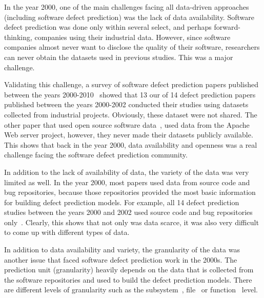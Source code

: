 In the year 2000, one of the main challenges facing all data-driven approaches (including software defect prediction) was the lack of data availability. Software defect prediction was done only within several select, and perhaps forward-thinking, companies using their industrial data.
However, since software companies almost never want to disclose the quality of their software, researchers can never obtain the datasets used in previous studies. This was a major challenge.

Validating this challenge, a survey of software defect prediction papers published between the years 2000-2010~\cite{Shihab2012PhD} showed that 13 our of 14 defect prediction papers published between the years 2000-2002 conducted their studies using datasets collected from industrial projects. Obviously, these dataset were not shared. The other paper that used open source software data~\cite{Denaro2002ICSE}, used data from the Apache Web server project, however, they never made their datasets publicly available. This shows that back in the year 2000, data availability and openness was a real challenge facing the software defect prediction community.

In addition to the lack of availability of data, the variety of the data was very limited as well. In the year 2000, most papers used data from source code and bug repositories, because those repositories provided the most basic information for building defect prediction models. For example, all 14 defect prediction studies between the years 2000 and 2002 used source code and bug repositories only~\cite{Shihab2012PhD}. Clearly, this shows that not only was data scarce, it was also very difficult to come up with different types of data.



In addition to data availability and variety, the granularity of the data was another issue that faced software defect prediction work in the 2000s. The prediction unit (granularity) heavily depends on the data that is collected from the software repositories and used to build the defect prediction models. There are different levels of granularity such as the subsystem~\cite{Zimmermann2008ISSRE}, file~\cite{Dambros2010MSR} or function~\cite{Kim2007ICSE} level. 

